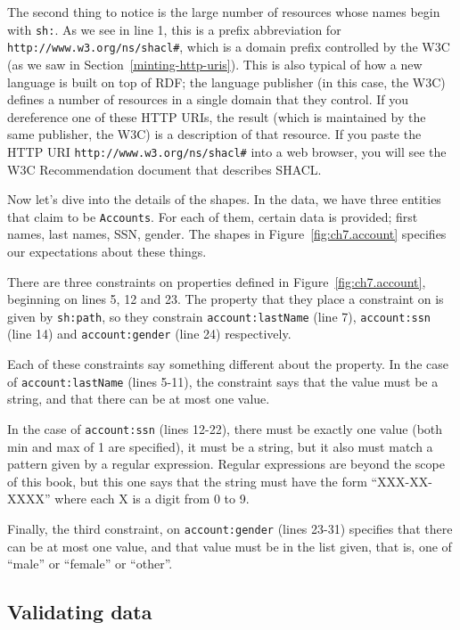 The second thing to notice is the large number of resources whose names
begin with \texttt{sh:}.  As we see in line 1, this is a prefix abbreviation for
\texttt{http://www.w3.org/ns/shacl\#}, which is a domain prefix controlled by the
W3C (as we saw in Section~\ref{minting-http-uris}).  This is also typical of how a
new language is built on top of RDF; the language publisher (in this case, the W3C)
defines a number of resources in a single domain that they control.  If you dereference
one of these HTTP URIs, the result (which is maintained by the same publisher, the W3C) is a 
description of that resource.  If you paste the HTTP URI 
\texttt{http://www.w3.org/ns/shacl\#} into a web browser, you will see the W3C 
Recommendation document that describes SHACL.


Now let's dive into the details of the shapes.  
In the data, we have three entities that claim to be \texttt{Accounts}.  For
each of them, certain data is provided; first names, last names, SSN, gender.
The shapes in Figure~\ref{fig:ch7.account} specifies our expectations about these
things.

There are three constraints on properties defined in Figure~\ref{fig:ch7.account}, beginning on lines 5, 12 and 23.  The property that they place a constraint on is given by \texttt{sh:path}, so they constrain \texttt{account:lastName} (line 7), \texttt{account:ssn} (line 14)  and \texttt{account:gender} (line 24) respectively.

Each of these constraints say something different about the property.  
In the case of \texttt{account:lastName} (lines 5-11), the constraint says 
that the value must be a string,  and that there can be at most one value.

In the case of \texttt{account:ssn} (lines 12-22), there must be exactly one value 
(both min and max of 1 are specified), it must be a string, but it also must match
a pattern given by a regular expression.  Regular expressions are beyond the scope
of this book, but this one says that the string must have the form ``XXX-XX-XXXX''
where each X is a digit from 0 to 9.

Finally, the third constraint, on \texttt{account:gender} (lines 23-31) specifies  that
there can be at most one value, and that value must be in the list given, that is, one
of ``male'' or ``female'' or ``other''.  

\hypertarget{validating-data}{%
\subsection{Validating data}\label{validating-data}}


